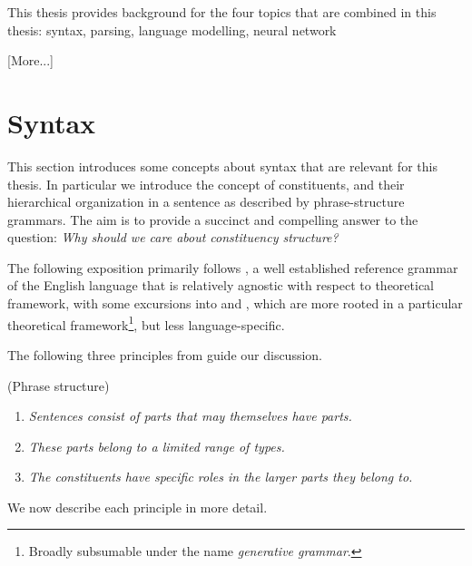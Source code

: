 % 

This thesis provides background for the four topics that are combined in this thesis: syntax, parsing, language modelling, neural network

[More...]

\section{Syntax}
This section introduces some concepts about syntax that are relevant for this thesis. In particular we introduce the concept of constituents, and their hierarchical organization in a sentence as described by phrase-structure grammars. The aim is to provide a succinct and compelling answer to the question: \textit{Why should we care about constituency structure?}

The following exposition primarily follows \citet{huddleston2002grammar}, a well established reference grammar of the English language that is relatively agnostic with respect to theoretical framework, with some excursions into \citet{carnie2010constituent} and \citet{everaert2015structures}, which are more rooted in a particular theoretical framework\footnote{Broadly subsumable under the name \textit{generative grammar}.}, but less language-specific.

The following three principles from \citet{huddleston2002grammar} guide our discussion.
\begin{definition}{(Phrase structure) }
  \begin{enumerate}
    \item \textit{Sentences consist of parts that may themselves have parts.}
    \item \textit{These parts belong to a limited range of types.}
    \item \textit{The constituents have specific roles in the larger parts they belong to.}
  \end{enumerate}
\end{definition}
We now describe each principle in more detail.

